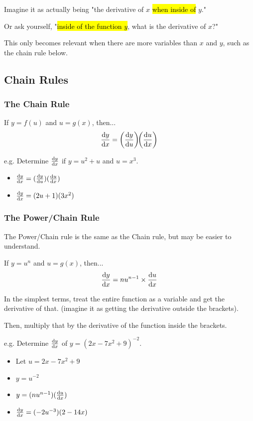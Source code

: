 \documentclass[a4paper,12pt]{article}
\begin{document}
Imagine it as actually being "the derivative of $x$ \hl{when inside of} $y$."

Or ask yourself, "\hl{inside of the function $y$}, what is the derivative of $x$?"

This only becomes relevant when there are more variables than $x$ and $y$, such as the chain rule below.

\subsection{Chain Rules}
\subsubsection{The Chain Rule}
If $y = f(u)$ and $u = g(x)$, then...
$$\dv{y}{x} = \left(\dv{y}{u}\right)\!\!\left(\dv{u}{x}\right)$$

e.g. Determine $\dv{y}{x}$ if $y = u^2 + u$ and $u = x^3$.
\begin{itemize}
    \item{$\dv{y}{x} = (\dv{y}{u})(\dv{u}{x})$}
    \item{$\dv{y}{x} = (2u + 1)(3x^2)$}
\end{itemize}

\subsubsection{The Power/Chain Rule}
The Power/Chain rule is the same as the Chain rule, but may be easier to understand.

If $y = u^n$ and $u = g(x)$, then...
$$\dv{y}{x} = nu^{n-1}\times\dv{u}{x}$$

In the simplest terms, treat the entire function as a variable and get the derivative of that. (imagine it as getting the derivative outside the brackets). 

Then, multiply that by the derivative of the function inside the brackets.

e.g. Determine $\dv{y}{x}$ of $y=(2x-7x^2+9)^{-2}$.
\begin{itemize}
    \item{Let $u = 2x-7x^2+9$}
    \item{$y = u^{-2}$}
    \item{$y = (nu^{n-1})(\dv{u}{x})$}
    \item{$\dv{y}{x} = (-2u^{-3})(2-14x)$}
\end{itemize}
\end{document}

